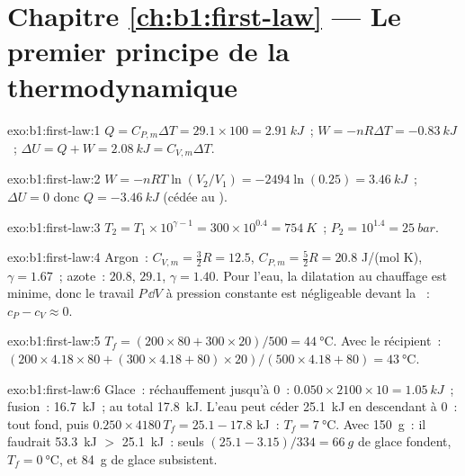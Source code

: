 \section*{Chapitre \ref{ch:b1:first-law} --- Le premier principe de la thermodynamique}

\begin{solution}{exo:b1:first-law:1}
$Q = C_{P,m}\Delta T = 29.1 \times 100 = \qty{2.91}{kJ}$~; $W = -nR\Delta T =
\qty{-0.83}{kJ}$~; $\Delta U = Q + W = \qty{2.08}{kJ} = C_{V,m}\Delta T$.
\end{solution}

\begin{solution}{exo:b1:first-law:2}
$W = -nRT\ln(V_2/V_1) = -2494\ln(0.25) = \qty{+3.46}{kJ}$~; $\Delta U = 0$ donc
$Q = \qty{-3.46}{kJ}$ (cédée au ).
\end{solution}

\begin{solution}{exo:b1:first-law:3}
$T_2 = T_1 \times 10^{\gamma - 1} = 300 \times 10^{0.4} = \qty{754}{K}$~; $P_2 =
10^{1.4} = \qty{25}{bar}$.
\end{solution}

\begin{solution}{exo:b1:first-law:4}
Argon~: $C_{V,m} = \tfrac32 R = 12.5$, $C_{P,m} = \tfrac52 R = 20.8$ J/(mol K),
$\gamma = 1.67$~; azote~: $20.8$, $29.1$, $\gamma = 1.40$. Pour l'eau, la
dilatation au chauffage est minime, donc le travail $P\,\dd V$ à pression
constante est négligeable devant la ~: $c_P - c_V \approx 0$.
\end{solution}

\begin{solution}{exo:b1:first-law:5}
$T_f = (200 \times 80 + 300 \times 20)/500 = \qty{44}{\degreeCelsius}$. Avec le
récipient~: $(200 \times 4.18 \times 80 + (300 \times 4.18 + 80) \times 20)/(500 \times
4.18 + 80) = \qty{43}{\degreeCelsius}$.
\end{solution}

\begin{solution}{exo:b1:first-law:6}
Glace~: réchauffement jusqu'à $0$~: $0.050 \times 2100 \times 10 = \qty{1.05}{kJ}$~;
fusion~: \qty{16.7}{kJ}~; au total \qty{17.8}{kJ}. L'eau peut céder \qty{25.1}{kJ}
en descendant à $0$~: tout fond, puis $0.250 \times 4180\,T_f = 25.1 - 17.8$ kJ~: $T_f =
\qty{7}{\degreeCelsius}$. Avec \qty{150}{g}~: il faudrait \qty{53.3}{kJ} $>$ \qty{25.1}{kJ}~:
seuls $(25.1 - 3.15)/334 = \qty{66}{g}$ de glace fondent, $T_f = \qty{0}{\degreeCelsius}$,
et \qty{84}{g} de glace subsistent.
\end{solution}

